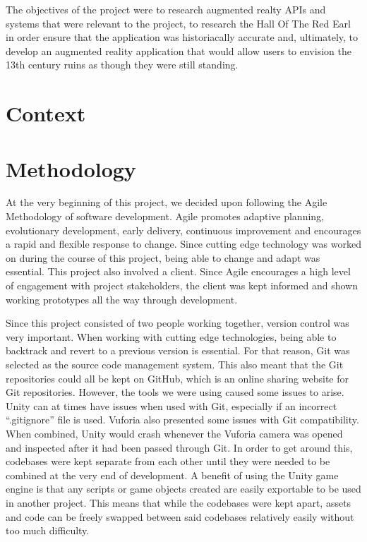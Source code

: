 The objectives of the project were to research augmented realty APIs and systems that were relevant to the project, to research the Hall Of The Red Earl in order ensure that the application was historiacally accurate and, ultimately, to develop an augmented reality application that would allow users to envision the 13th century ruins as though they were still standing. 
\chapter{Context}

\chapter{Methodology}
At the very beginning of this project, we decided upon following the Agile Methodology of software development. Agile promotes adaptive planning, evolutionary development, early delivery, continuous improvement and encourages a rapid and flexible response to change. Since cutting edge technology was worked on during the course of this project, being able to change and adapt was essential. This project also involved a client. Since Agile encourages a high level of engagement with project stakeholders, the client was kept informed and shown working prototypes all the way through development.

Since this project consisted of two people working together, version control was very important. When working with cutting edge technologies, being able to backtrack and revert to a previous version is essential. For that reason, Git was selected as the source code management system. This also meant that the Git repositories could all be kept on GitHub, which is an online sharing website for Git repositories. However, the tools we were using caused some issues to arise. Unity can at times have issues when used with Git, especially if an incorrect “.gitignore” file is used. Vuforia also presented some issues with Git compatibility. When combined, Unity would crash whenever the Vuforia camera was opened and inspected after it had been passed through Git. In order to get around this, codebases were kept separate from each other until they were needed to be combined at the very end of development. A benefit of using the Unity game engine is that any scripts or game objects created are easily exportable to be used in another project. This means that while the codebases were kept apart, assets and code can be freely swapped between said codebases relatively easily without too much difficulty.

